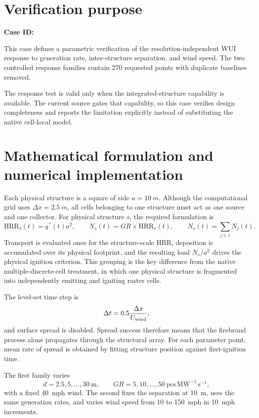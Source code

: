 \section{Verification purpose}

\textbf{Case ID:} \CaseID

This case defines a parametric verification of the resolution-independent WUI response to generation rate, inter-structure separation, and wind speed. The two controlled response families contain 270 requested points with duplicate baselines removed.

The response test is valid only when the integrated-structure capability is available. The current source gates that capability, so this case verifies design completeness and reports the limitation explicitly instead of substituting the native cell-local model.

\section{Mathematical formulation and numerical implementation}

Each physical structure is a square of side \(a=\SI{10}{m}\). Although the
computational grid uses \(\Delta x=\SI{2.5}{m}\), all cells belonging to one
structure must act as one source and one collector. For physical structure
\(s\), the required formulation is
\[
 \mathrm{HRR}_s(t)=q^{\prime\prime}(t)a^2,
 \qquad \dot N_s(t)=GR\times\mathrm{HRR}_s(t),
 \qquad N_s(t)=\sum_{j\in s}N_j(t).
\]
Transport is evaluated once for the structure-scale HRR, deposition is
accumulated over its physical footprint, and the resulting load
\(N_s/a^2\) drives the physical ignition criterion. This grouping is the key
difference from the native multiple-discrete-cell treatment, in which one
physical structure is fragmented into independently emitting and igniting
raster cells.

The level-set time step is
\[
 \Delta t=0.5\frac{\Delta x}{U_{\rm wind}},
\]
and surface spread is disabled. Spread success therefore means that the
firebrand process alone propagates through the structural array. For each
parameter point, mean rate of spread is obtained by fitting structure position
against first-ignition time.

The first family varies
\[
 d=2.5,5,\ldots,30\ \mathrm{m},
 \qquad GR=5,10,\ldots,50\
 \mathrm{pcs\,MW^{-1}\,s^{-1}},
\]
with a fixed 40~mph wind. The second fixes the separation at 10~m, uses the
same generation rates, and varies wind speed from 10 to 150~mph in 10~mph
increments.

